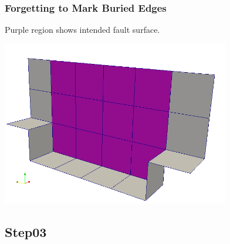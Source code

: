 \documentclass{beamer}
\begin{document}
\begin{frame}
  \frametitle{Forgetting to Mark Buried Edges}

  Purple region shows intended fault surface.
  \begin{center}
    \includegraphics[height=7.2cm]{figs/faultedges}
  \end{center}
  
\end{frame}


\subsection{Step03}
\end{document}
